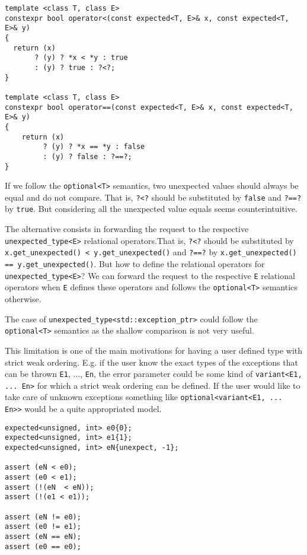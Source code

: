 \documentclass[a4paper,10pt]{article}
\newcommand{\cpp}[1]{\lstinline{#1}}
\begin{document}
\begin{lstlisting}
template <class T, class E>
constexpr bool operator<(const expected<T, E>& x, const expected<T, E>& y)
{
  return (x)
       ? (y) ? *x < *y : true
       : (y) ? true : ?<?;
}

template <class T, class E>
constexpr bool operator==(const expected<T, E>& x, const expected<T, E>& y)
{
    return (x)
         ? (y) ? *x == *y : false
         : (y) ? false : ?==?;
}
\end{lstlisting}

If we follow the \cpp{optional<T>} semantics, two unexpected values should always be equal and do not compare. That is, \cpp{?<?} should be substituted by \cpp{false} and \cpp{?==?} by \cpp{true}. But considering all the unexpected value equals seems counterintuitive.

The alternative consists in forwarding the request to the respective  \cpp{unexpected_type<E>} relational operators.That is, \cpp{?<?} should be substituted by \cpp{x.get_unexpected() < y.get_unexpected()} and \cpp{?==?} by \cpp{x.get_unexpected() == y.get_unexpected()}. But how to define the relational operators for \cpp{unexpected_type<E>}? We can forward the request to the respective \cpp{E} relational operators when \cpp{E} defines these operators and follows the \cpp{optional<T>} semantics otherwise. 

The case of \cpp{unexpected_type<std::exception_ptr>} could follow the \cpp{optional<T>} semantics as the shallow comparison is not very useful.

This limitation is one of the main motivations for having a user defined type with strict weak ordering. E.g. if the user know the exact types of the exceptions that can be thrown \cpp{E1}, ..., \cpp{En}, the error parameter could be some kind of \cpp{variant<E1, ... En>} for which a strict weak ordering can be defined. If the user would like to take care of unknown exceptions something like \cpp{optional<variant<E1, ... En>>} would be a quite appropriated model. 

\begin{lstlisting}
expected<unsigned, int> e0{0};
expected<unsigned, int> e1{1};
expected<unsigned, int> eN{unexpect, -1};

assert (eN < e0);
assert (e0 < e1);
assert (!(eN  < eN));
assert (!(e1 < e1));

assert (eN != e0);
assert (e0 != e1);
assert (eN == eN);
assert (e0 == e0);
\end{lstlisting}
\end{document}

